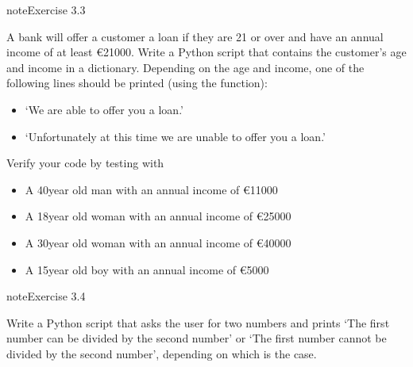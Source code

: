 \documentclass[letterpaper,10pt,english]{jupyterBook}
\begin{document}
\begin{sphinxadmonition}{note}{Exercise 3.3}

\sphinxAtStartPar
A bank will offer a customer a loan if they are 21 or over and have an annual income of at least €21000. Write a Python script that contains the customer’s age and income in a dictionary. Depending on the age and income, one of the following lines should be printed (using the  function):
\begin{itemize}
\item {} 
\sphinxAtStartPar
‘We are able to offer you a loan.’

\item {} 
\sphinxAtStartPar
‘Unfortunately at this time we are unable to offer you a loan.’

\end{itemize}

\sphinxAtStartPar
Verify your code by testing with
\begin{itemize}
\item {} 
\sphinxAtStartPar
A 40\sphinxhyphen{}year old man with an annual income of €11000

\item {} 
\sphinxAtStartPar
A 18\sphinxhyphen{}year old woman with an annual income of €25000

\item {} 
\sphinxAtStartPar
A 30\sphinxhyphen{}year old woman with an annual income of €40000

\item {} 
\sphinxAtStartPar
A 15\sphinxhyphen{}year old boy with an annual income of €5000

\end{itemize}
\end{sphinxadmonition}

\begin{sphinxadmonition}{note}{Exercise 3.4}

\sphinxAtStartPar
Write a Python script that asks the user for two numbers and prints ‘The first number can be divided by the second number’ or ‘The first number cannot be divided by the second number’, depending on which is the case.
\end{sphinxadmonition}
\end{document}
